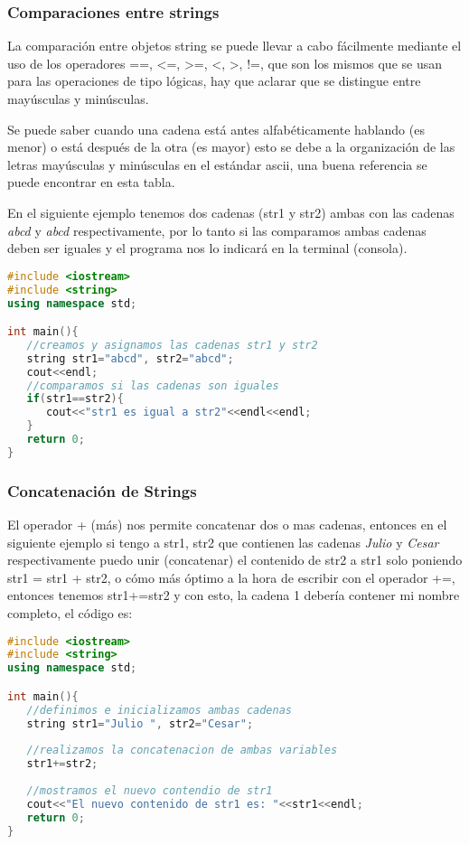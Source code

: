 \subsubsection{Comparaciones entre strings} 
La comparación entre objetos string se puede llevar a cabo fácilmente mediante el uso de los operadores ==, <=, >=, <, >, !=, que son los mismos que se usan para las operaciones de tipo lógicas, hay que aclarar que se distingue entre mayúsculas y minúsculas.

Se puede saber cuando una cadena está antes alfabéticamente hablando (es menor) o está después de la otra (es mayor) esto se debe a la organización de las letras mayúsculas y minúsculas en el estándar ascii, una buena referencia se puede encontrar en esta tabla.

En el siguiente ejemplo tenemos dos cadenas (str1 y str2) ambas con las cadenas \emph{abcd} y \emph{abcd} respectivamente, por lo tanto si las comparamos ambas cadenas deben ser iguales y el programa nos lo indicará en la terminal (consola).

\begin{lstlisting}[language=C++]
#include <iostream>
#include <string>
using namespace std;

int main(){
   //creamos y asignamos las cadenas str1 y str2
   string str1="abcd", str2="abcd";
   cout<<endl;
   //comparamos si las cadenas son iguales
   if(str1==str2){
      cout<<"str1 es igual a str2"<<endl<<endl;
   }
   return 0;
}
\end{lstlisting}

\subsubsection{Concatenación de Strings}
El operador + (más) nos permite concatenar dos o mas cadenas, entonces en el siguiente ejemplo si tengo a str1, str2 que contienen las cadenas \emph{Julio} y \emph{Cesar} respectivamente puedo unir (concatenar) el contenido de str2 a str1 solo poniendo str1 = str1 + str2, o cómo más óptimo a la hora de escribir con el operador +=, entonces tenemos str1+=str2 y con esto, la cadena 1 debería contener mi nombre completo, el código es:
\begin{lstlisting}[language=C++]
#include <iostream>
#include <string>
using namespace std;

int main(){
   //definimos e inicializamos ambas cadenas
   string str1="Julio ", str2="Cesar";
	
   //realizamos la concatenacion de ambas variables
   str1+=str2;
	
   //mostramos el nuevo contendio de str1
   cout<<"El nuevo contenido de str1 es: "<<str1<<endl;
   return 0;
}
\end{lstlisting}

